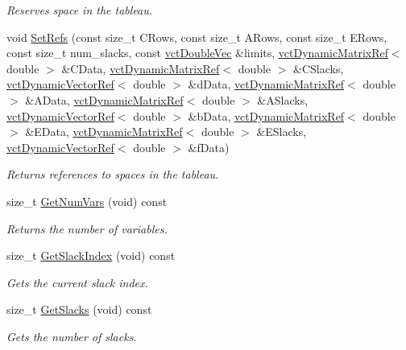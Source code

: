 \begin{DoxyCompactItemize}
\begin{DoxyCompactList}\small\item\em Reserves space in the tableau. \end{DoxyCompactList}\item 
void \hyperlink{classnmr_constraint_optimizer_af4181e4effd604d36c3b16f01b475ad7}{Set\-Refs} (const size\-\_\-t C\-Rows, const size\-\_\-t A\-Rows, const size\-\_\-t E\-Rows, const size\-\_\-t num\-\_\-slacks, const \hyperlink{vct_dynamic_vector_types_8h_ade4b3068c86fb88f41af2e5187e491c2}{vct\-Double\-Vec} \&limits, \hyperlink{classvct_dynamic_matrix_ref}{vct\-Dynamic\-Matrix\-Ref}$<$ double $>$ \&C\-Data, \hyperlink{classvct_dynamic_matrix_ref}{vct\-Dynamic\-Matrix\-Ref}$<$ double $>$ \&C\-Slacks, \hyperlink{classvct_dynamic_vector_ref}{vct\-Dynamic\-Vector\-Ref}$<$ double $>$ \&d\-Data, \hyperlink{classvct_dynamic_matrix_ref}{vct\-Dynamic\-Matrix\-Ref}$<$ double $>$ \&A\-Data, \hyperlink{classvct_dynamic_matrix_ref}{vct\-Dynamic\-Matrix\-Ref}$<$ double $>$ \&A\-Slacks, \hyperlink{classvct_dynamic_vector_ref}{vct\-Dynamic\-Vector\-Ref}$<$ double $>$ \&b\-Data, \hyperlink{classvct_dynamic_matrix_ref}{vct\-Dynamic\-Matrix\-Ref}$<$ double $>$ \&E\-Data, \hyperlink{classvct_dynamic_matrix_ref}{vct\-Dynamic\-Matrix\-Ref}$<$ double $>$ \&E\-Slacks, \hyperlink{classvct_dynamic_vector_ref}{vct\-Dynamic\-Vector\-Ref}$<$ double $>$ \&f\-Data)
\begin{DoxyCompactList}\small\item\em Returns references to spaces in the tableau. \end{DoxyCompactList}\item 
size\-\_\-t \hyperlink{classnmr_constraint_optimizer_ad0f0cc81edb92ebab781f24fddd17baf}{Get\-Num\-Vars} (void) const 
\begin{DoxyCompactList}\small\item\em Returns the number of variables. \end{DoxyCompactList}\item 
size\-\_\-t \hyperlink{classnmr_constraint_optimizer_adfcdfabcb97d1867b6f986e825fb2f98}{Get\-Slack\-Index} (void) const 
\begin{DoxyCompactList}\small\item\em Gets the current slack index. \end{DoxyCompactList}\item 
size\-\_\-t \hyperlink{classnmr_constraint_optimizer_a322ea4c8c390d4afc6eb8414ac59b3cf}{Get\-Slacks} (void) const 
\begin{DoxyCompactList}\small\item\em Gets the number of slacks. \end{DoxyCompactList}\item 

\end{DoxyCompactItemize}
